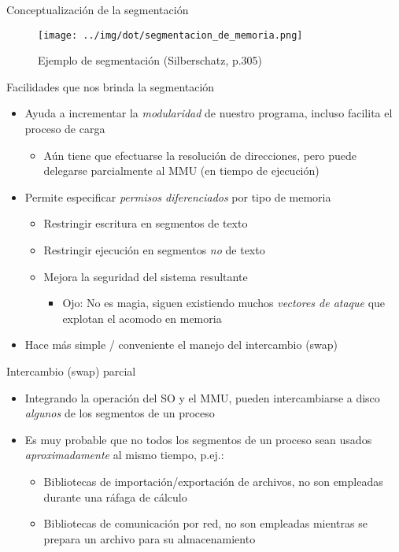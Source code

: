 \documentclass[presentation]{beamer}
\begin{document}
\begin{frame}[label={sec:orga100ffd}]{Conceptualización de la segmentación}
\begin{figure}[htbp]
\centering
\texttt{[image: ../img/dot/segmentacion\_de\_memoria.png]}
\caption{Ejemplo de segmentación (Silberschatz, p.305)}
\end{figure}
\end{frame}

\begin{frame}[label={sec:org5df9f70}]{Facilidades que nos brinda la segmentación}
\begin{itemize}
\item Ayuda a incrementar la \emph{modularidad} de nuestro programa, incluso
facilita el proceso de carga
\begin{itemize}
\item Aún tiene que efectuarse la resolución de direcciones, pero puede
delegarse parcialmente al MMU (en tiempo de ejecución)
\end{itemize}
\item Permite especificar \emph{permisos diferenciados} por tipo de memoria
\begin{itemize}
\item Restringir escritura en segmentos de texto
\item Restringir ejecución en segmentos \emph{no} de texto
\item Mejora la seguridad del sistema resultante
\begin{itemize}
\item Ojo: No es magia, siguen existiendo muchos \emph{vectores de ataque}
que explotan el acomodo en memoria
\end{itemize}
\end{itemize}
\item Hace más simple / conveniente el manejo del intercambio (swap)
\end{itemize}
\end{frame}

\begin{frame}[label={sec:org5ddd5d1}]{Intercambio (swap) parcial}
\begin{itemize}
\item Integrando la operación del SO y el MMU, pueden intercambiarse a
disco \emph{algunos} de los segmentos de un proceso
\item Es muy probable que no todos los segmentos de un proceso sean
usados \emph{aproximadamente} al mismo tiempo, p.ej.:
\begin{itemize}
\item Bibliotecas de importación/exportación de archivos, no son
empleadas durante una ráfaga de cálculo
\item Bibliotecas de comunicación por red, no son empleadas mientras se
prepara un archivo para su almacenamiento
\end{itemize}
\end{itemize}
\end{frame}
\end{document}
